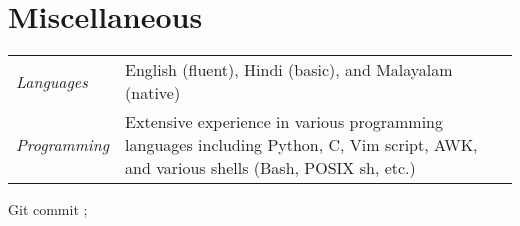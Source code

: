 \documentclass[10pt]{article}
\begin{document}


\section*{Miscellaneous}

\begin{tabular}{@{}p{1in}p{5in}}
  \emph{Languages}   & English (fluent), Hindi (basic), and Malayalam (native)\\
  \emph{Programming} & Extensive experience in various programming languages including Python, C, Vim script, AWK, and various shells (Bash, POSIX sh, etc.)
\end{tabular}


\bigskip
\begin{center}
  \hypersetup{hidelinks}\color{gray}
  Git commit \href{https://github.com/manu-mannattil/vitae/tree/\gitHash}{\texttt{\gitAbbrevHash}}; \gitAuthorIsoDate
\end{center}
\end{document}
